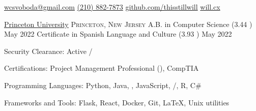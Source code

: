 \documentclass[10pt,letterpaper]{article}
\begin{document}
\sloppy


\nobreakvspace{0.3em}

\noindent\href{mailto:wcsvoboda.at.gmail.dot.com}{wcsvoboda\mbox{}@\mbox{}gmail.com}\sbull
\href{tel:2108827873}{(210) 882-7873}\sbull
\href{https://github.com/thisstillwill}{github.com/thisstillwill}\sbull
\href{https://will.cx}{will.cx}

\spacedhrule{0.9em}{-0.4em}


\headedsection
  {\href{https://www.princeton.edu/}{Princeton University}}
  {\textsc{Princeton, New Jersey}} {%
  \headedsubsection
    {A.B. in Computer Science \textnormal{(3.44 )}}
    {May 2022}
    {}
  \headedsubsection
    {Certificate in Spanish Language and Culture \textnormal{(3.93 )}}
    {May 2022}{}
}


\spacedhrule{0.5em}{-0.4em}


\inlineheadsection
  {Security Clearance:}
  {Active /}

\inlineheadsection
  {Certifications:}
  {Project Management Professional (), CompTIA \SP}

\inlineheadsection
  {Programming Languages:}
  {Python, Java, , JavaScript, /, R, C\#}

\inlineheadsection
  {Frameworks and Tools:}
  {Flask, React, Docker, Git, \LaTeX, Unix utilities}
\end{document}
